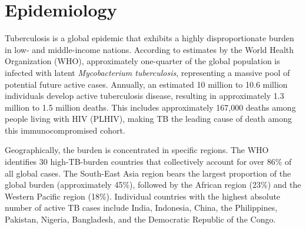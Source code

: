 \section*{Epidemiology}
Tuberculosis is a global epidemic that exhibits a highly disproportionate burden in low- and middle-income nations. According to estimates by the World Health Organization (WHO), approximately one-quarter of the global population is infected with latent \textit{Mycobacterium tuberculosis}, representing a massive pool of potential future active cases. Annually, an estimated 10 million to 10.6 million individuals develop active tuberculosis disease, resulting in approximately 1.3 million to 1.5 million deaths. This includes approximately 167,000 deaths among people living with HIV (PLHIV), making TB the leading cause of death among this immunocompromised cohort.

Geographically, the burden is concentrated in specific regions. The WHO identifies 30 high-TB-burden countries that collectively account for over 86\% of all global cases. The South-East Asia region bears the largest proportion of the global burden (approximately 45\%), followed by the African region (23\%) and the Western Pacific region (18\%). Individual countries with the highest absolute number of active TB cases include India, Indonesia, China, the Philippines, Pakistan, Nigeria, Bangladesh, and the Democratic Republic of the Congo.


